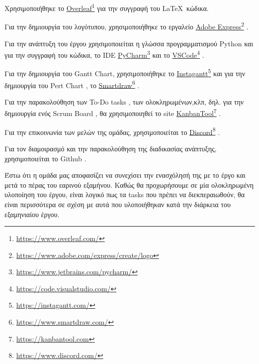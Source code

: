 \documentclass{../ol-softwaremanual}
\newcommand{\doclink}[2]{\href{#1}{#2}\footnote{\url{#1}}}
\begin{document}
	
	\vspace{20pt}
	
	
	\vspace{20pt}
	\flushleft
	Χρησιμοποιήθηκε το \en \doclink{https://www.overleaf.com/}{Overleaf} \gr για την συγγραφή του \LaTeX\ κώδικα. \break
	
	Για την δημιουργία του λογότυπου, χρησιμοποιήθηκε το εργαλείο \en \doclink{https://www.adobe.com/express/create/logo}{Adobe Express} . \gr \break
	
	Για την ανάπτυξη του έργου χρησιμοποιείται η γλώσσα προγραμματισμού \en Python \gr και για την συγγραφή του κώδικα, το \en IDE \doclink{https://www.jetbrains.com/pycharm/}{PyCharm} \gr και το \en \doclink{https://code.visualstudio.com/}{VSCode} \gr .         \\ \break
	
	Για την δημιουργία του \en Gantt Chart, \gr χρησιμοποιήθηκε το \en \doclink{https://instagantt.com/}{Instagantt} \gr και για την δημιουργία του \en Pert Chart \gr, το \en \doclink{https://www.smartdraw.com/}{Smartdraw} \gr. \break 
	
	Για την παρακολούθηση των \en To-Do tasks \gr, των ολοκληρωμένων,κλπ, δηλ. για την δημιουργία ενός \en Scrum Board \gr, θα χρησιμοποιηθεί το \en site \doclink{https://kanbantool.com}{KanbanTool} \gr. \break 
	
	Για την επικοινωνία των μελών της ομάδας, χρησιμοποιείται το \en \doclink{ https://www.discord.com/}{Discord} \gr . \linebreak 
	
	
	Για τον διαμοιρασμό και την παρακολούθηση της διαδικασίας ανάπτυξης, χρησιμοποιείται το \en Github \gr.
	
	
	
	\newpage
	
	\flushleft
	
	\vspace{20pt}
	
	Έστω ότι η ομάδα μας αποφασίζει να συνεχίσει την ενασχόλησή της με το έργο και μετά το πέρας του εαρινού εξαμήνου. Καθώς θα προχωρήσουμε σε μία ολοκληρωμένη υλοποίηση του έργου, είναι λογικό πως τα \en tasks \gr που πρέπει να διεκπεραιωθούν, θα είναι περισσότερα σε σχέση με αυτά που υλοποιήθηκαν κατά την διάρκεια του εξαμηνιαίου έργου.
	
	\vspace{20pt}
	
\end{document}
